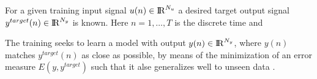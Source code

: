 For a given training input signal $u(n) \in \mathrm{I\negthinspace R}^{N_u}$ a desired target
output signal $y^{target}(n) \in \mathrm{I\negthinspace R}^{N_y}$ is known.
%
Here $n = 1,\ldots,T$ is the discrete time and 

The training seeks to learn a model with output $y(n) \in
\mathrm{I\negthinspace R}^{N_y}$, where $y(n)$ matches $y^{target}(n)$ as close as
possible, by means of the minimization of an error measure
$E(y,y^{target})$ such that it alse generalizes well to unseen data
\citep{Lukose2012}.
